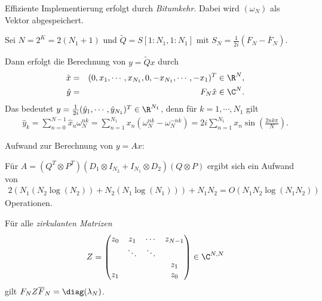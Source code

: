 \begin{Bemerkung}
    Effiziente Implementierung erfolgt durch \emph{Bitumkehr}. Dabei wird
    $(\omega_N)$ als Vektor abgespeichert.
\end{Bemerkung}


\begin{Anwendung}
    Sei $N = 2^K = 2 (N_1 + 1)$ und $\tilde Q = S[1:N_1, 1:N_1]$ mit
    $S_N = \frac{1}{2i} (F_N - \overline F_N)$.

    Dann erfolgt die Berechnung von $y = \tilde Q x$ durch
    \begin{eqnarray*}
            \hat x
        &=& (0, x_1, \cdots, x_{N_1}, 0, -x_{N_1}, \cdots, -x_1)^T \in \R^N, \\
            \hat y
        &=& F_N \hat x \in \C^N.
    \end{eqnarray*}
    Das bedeutet $y = \frac{1}{2i} (\hat y_1, \cdots, \hat y_{N_1})^T \in
    \R^{N_1}$, denn für $k = 1, \cdots, N_1$ gilt
    \begin{eqnarray*}
          \hat y_k
        = \sum_{n=0}^{N-1} \hat x_n \omega_N^{nk}
        = \sum_{n=1}^{N_1}
          x_n \left(\omega_N^{nk} - \omega_N^{-nk}\right)
        = 2i \sum_{n=1}^{N_1} x_n \sin\left(\frac{2 n k \pi}{N}\right).
    \end{eqnarray*}
\end{Anwendung}


Aufwand zur Berechnung von $y = Ax$:

Für $A = (Q^T \otimes P^T) (D_1 \otimes I_{N_2} + I_{N_1} \otimes
D_2)(Q \otimes P)$ ergibt sich ein Aufwand von 
\begin{eqnarray*}
    2 (N_1 (N_2 \log(N_2)) + N_2 (N_1 \log(N_1))) + N_1 N_2 = O(N_1 N_2
    \log(N_1 N_2))
\end{eqnarray*}
Operationen.


\begin{Bemerkung}
    Für alle \emph{zirkulanten Matrizen}
    \begin{eqnarray*}
        Z = \begin{pmatrix}
                z_0 & z_1 & \cdots & z_{N-1} \\
                & \ddots & \ddots \\
                & & & z_1 \\
                z_1 & & & z_0
            \end{pmatrix} \in \C^{N,N}
    \end{eqnarray*}
    gilt $F_N Z \overline F_N = \diag(\lambda_N)$.
\end{Bemerkung}


